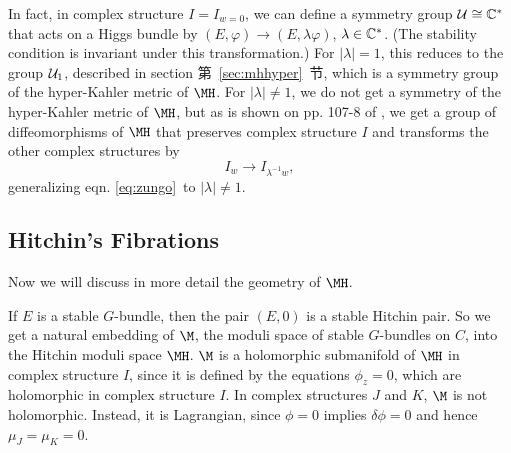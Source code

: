 In fact, in complex structure $I=I_{w=0}$, we can define a
symmetry group ${\cal U}\cong \Bbb{C}^*$ that acts on a Higgs
bundle by $(E,\varphi)\to (E,\lambda\varphi)$,
$\lambda\in\Bbb{C}^*$. (The stability condition is invariant under
this transformation.) For $|\lambda|=1$, this reduces to the group
${\cal U}_1$, described in section 第~\ref{sec:mhhyper}~节, which is a symmetry
group of the hyper-Kahler metric of $\MH$. For $|\lambda|\not=1$,
we do not get a symmetry of the hyper-Kahler metric of $\MH$, but
as is shown on pp. 107-8 of \cite{ref20}, we get a group of
diffeomorphisms of $\MH$ that preserves complex structure $I$ and
transforms the other complex structures by %
\setcounter{equation}{22}
\begin{equation}\label{eq:trymodo}
I_w\to
I_{\lambda^{-1}w},
\end{equation}
 generalizing eqn. \eqref{eq:zungo}\ to
$|\lambda|\not=1$.

\subsection{Hitchin's Fibrations}

\label{sec:hitchfib}

Now we will discuss in more detail the geometry of $\MH$.

If $E$ is a stable $G$-bundle, then the pair $(E,0)$ is a stable
Hitchin pair.  So we get a natural embedding of $\M$, the moduli
space of stable $G$-bundles on $C$, into the Hitchin moduli space
$\MH$.  $\M$ is a holomorphic submanifold of $\MH$ in complex
structure $I$, since it is defined by the equations $\phi_z=0$,
which are holomorphic in complex structure $I$.  In complex
structures $J$ and $K$, $\M$ is not holomorphic. Instead, it is
Lagrangian, since $\phi=0$ implies $\delta\phi=0$ and hence
$\mu_J=\mu_K=0$.

